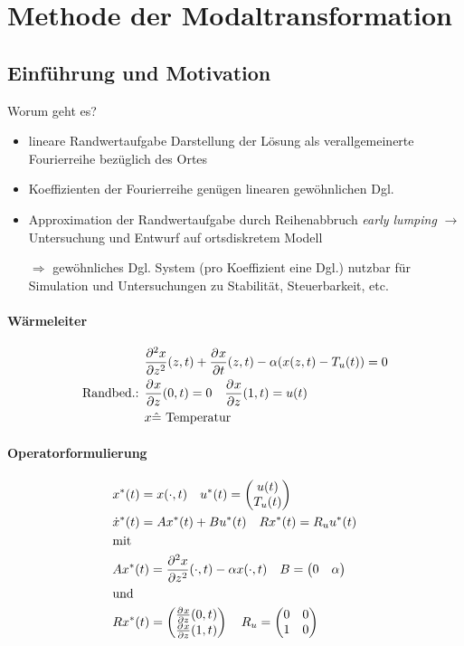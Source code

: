 \newpage
\section{Methode der Modaltransformation}
\setcounter{equation}{0}
\subsection{Einführung und Motivation}
Worum geht es? 
\begin{itemize}
\item lineare Randwertaufgabe 
	\subitem Darstellung der Lösung als verallgemeinerte Fourierreihe bezüglich des Ortes
\item Koeffizienten der Fourierreihe
	\subitem genügen linearen gewöhnlichen Dgl.
\item Approximation der Randwertaufgabe durch Reihenabbruch
	\subitem \emph{early lumping} $\rightarrow$ Untersuchung und Entwurf auf ortsdiskretem Modell
\item[$\Rightarrow$] gewöhnliches Dgl. System (pro Koeffizient eine Dgl.)
	\subitem nutzbar für Simulation und Untersuchungen zu Stabilität, Steuerbarkeit, etc. 
\end{itemize}
\paragraph{Wärmeleiter}
\begin{align*}
&\pd[2]{x}{z^2}(z,t)+\pd{x}{t}(z,t)-\alpha(x(z,t)-T_u(t))=0 \\
\textrm{Randbed.: } & \pd{x}{z}(0,t) = 0 \quad \pd{x}{z}(1,t) = u(t) \\
& x \hat{=} \textrm{ Temperatur}
\end{align*}
\paragraph{Operatorformulierung}
\begin{align*}
&x^*(t)=x(\cdot,t) \quad u^*(t) = \begin{pmatrix} u(t) \\ T_u(t) \end{pmatrix} \\
&\dot{x}^*(t) = Ax^*(t)+Bu^*(t) \quad Rx^*(t)=R_u u^*(t)\\
&\textrm{mit} \\
&Ax^*(t) = \pd[2]{x}{z^2}(\cdot,t)-\alpha x(\cdot,t) \quad B = \begin{pmatrix}0 & \alpha\end{pmatrix} \\
&\textrm{und} \\
&Rx^*(t) = \begin{pmatrix} \pd{x}{z}(0,t) \\ \pd{x}{z}(1,t) \end{pmatrix} \quad R_u = \begin{pmatrix}  0 & 0 \\ 1 & 0\end{pmatrix}
\end{align*}
